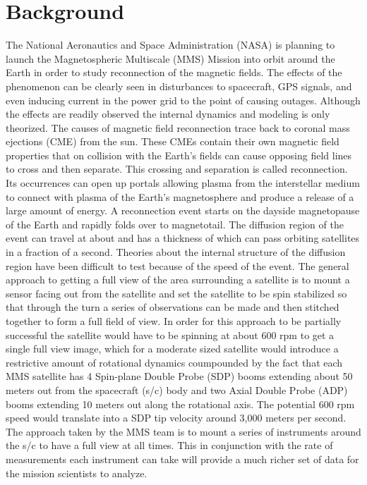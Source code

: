 
\chapter{Background}
\label{chap:Background}

The National Aeronautics and Space Administration (NASA) is planning to launch the Magnetospheric Multiscale (MMS) Mission into orbit around the Earth in order to study reconnection of the magnetic fields.  The effects of the phenomenon can be clearly seen in disturbances to spacecraft, GPS signals, and even inducing current in the power grid to the point of causing outages.  Although the effects are readily observed the internal dynamics and modeling is only theorized.  The causes of magnetic field reconnection trace back to coronal mass ejections (CME) from the sun.  These CMEs contain their own magnetic field properties that on collision with the Earth's fields can cause opposing field lines to cross and then separate.  This crossing and separation is called reconnection.  Its occurrences can open up portals allowing plasma from the interstellar medium to connect with plasma of the Earth's magnetosphere and produce a release of a large amount of energy.  A reconnection event starts on the dayside magnetopause of the Earth and
rapidly folds over to magnetotail.  The diffusion region of the event can travel at about  and has a thickness of  which can pass orbiting satellites in a fraction of a second.  Theories about the internal structure of the diffusion region  have been difficult to test because of the speed of the event.  The general approach to getting a full view of the area surrounding a satellite is to mount a sensor facing out from the satellite and set the satellite to be spin stabilized so that through the turn a series of observations can be made and then stitched together to form a full field of view.  In order for this approach to be partially successful the satellite would have to be spinning at about 600 rpm to get a single full view image, which for a moderate sized satellite would introduce a restrictive amount of rotational dynamics coumpounded by the fact that each MMS satellite has 4 Spin-plane Double Probe (SDP) booms  extending about 50 meters out from the spacecraft (s/c) body and two Axial Double Probe (ADP) booms extending 10 meters out along the rotational axis.  The potential 600 rpm speed would translate into a SDP tip velocity around 3,000 meters per second.
The approach taken by the MMS team is to mount a series of instruments around the s/c to have a full view at all times.  This in conjunction with the rate of measurements each instrument can take will provide a much richer set of data for the mission scientists to analyze.


